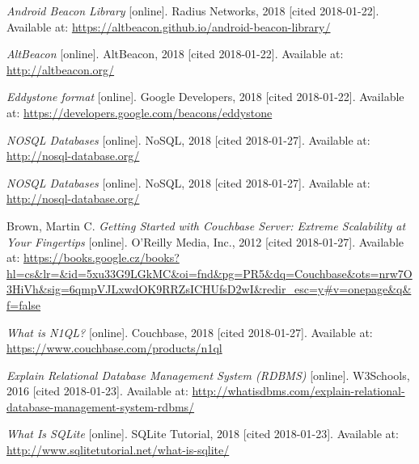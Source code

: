 \begin{thebibliography}{10}
\textit{Android Beacon Library} [online]. Radius Networks, 2018 [cited 2018-01-22]. Available at: \url{https://altbeacon.github.io/android-beacon-library/}

\textit{AltBeacon} [online]. AltBeacon, 2018 [cited 2018-01-22]. Available at: \url{http://altbeacon.org/}

\textit{Eddystone format} [online]. Google Developers, 2018 [cited 2018-01-22]. Available at: \url{https://developers.google.com/beacons/eddystone}

\textit{NOSQL Databases} [online]. NoSQL, 2018 [cited 2018-01-27]. Available at: \url{http://nosql-database.org/}

\textit{NOSQL Databases} [online]. NoSQL, 2018 [cited 2018-01-27]. Available at: \url{http://nosql-database.org/}

Brown, Martin C. \textit{Getting Started with Couchbase Server: Extreme Scalability at Your Fingertips} [online]. O'Reilly Media, Inc., 2012 [cited 2018-01-27]. Available at: \url{https://books.google.cz/books?hl=cs&lr=&id=5xu33G9LGkMC&oi=fnd&pg=PR5&dq=Couchbase&ots=nrw7O3HiVh&sig=6qmpVJLxwdOK9RRZsICHUfsD2wI&redir_esc=y#v=onepage&q&f=false}

\textit{What is N1QL?} [online]. Couchbase, 2018 [cited 2018-01-27]. Available at: \url{https://www.couchbase.com/products/n1ql}

\textit{Explain Relational Database Management System (RDBMS)} [online]. W3Schools, 2016 [cited 2018-01-23]. Available at: \url{http://whatisdbms.com/explain-relational-database-management-system-rdbms/}

\textit{What Is SQLite} [online]. SQLite Tutorial, 2018 [cited 2018-01-23]. Available at: \url{http://www.sqlitetutorial.net/what-is-sqlite/}

\end{thebibliography}